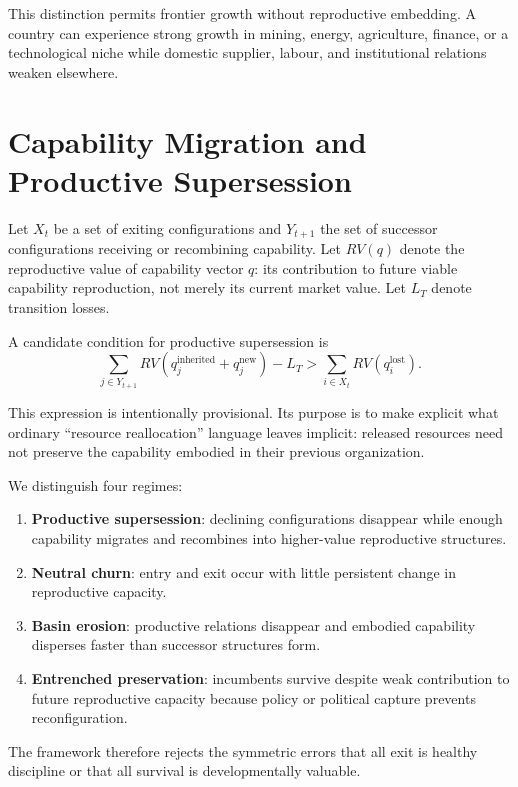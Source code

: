 \documentclass[11pt]{article}
\begin{document}
This distinction permits frontier growth without reproductive embedding. A country can experience strong growth in mining, energy, agriculture, finance, or a technological niche while domestic supplier, labour, and institutional relations weaken elsewhere.

\section{Capability Migration and Productive Supersession}

Let $X_t$ be a set of exiting configurations and $Y_{t+1}$ the set of successor configurations receiving or recombining capability. Let $RV(q)$ denote the reproductive value of capability vector $q$: its contribution to future viable capability reproduction, not merely its current market value. Let $L_T$ denote transition losses.

A candidate condition for productive supersession is
\[
\sum_{j\in Y_{t+1}} RV\!\left(q_j^{\mathrm{inherited}}+q_j^{\mathrm{new}}\right)-L_T
>
\sum_{i\in X_t} RV\!\left(q_i^{\mathrm{lost}}\right).
\]

This expression is intentionally provisional. Its purpose is to make explicit what ordinary ``resource reallocation'' language leaves implicit: released resources need not preserve the capability embodied in their previous organization.

We distinguish four regimes:

\begin{enumerate}
    \item \textbf{Productive supersession}: declining configurations disappear while enough capability migrates and recombines into higher-value reproductive structures.
    \item \textbf{Neutral churn}: entry and exit occur with little persistent change in reproductive capacity.
    \item \textbf{Basin erosion}: productive relations disappear and embodied capability disperses faster than successor structures form.
    \item \textbf{Entrenched preservation}: incumbents survive despite weak contribution to future reproductive capacity because policy or political capture prevents reconfiguration.
\end{enumerate}

The framework therefore rejects the symmetric errors that all exit is healthy discipline or that all survival is developmentally valuable.
\end{document}
